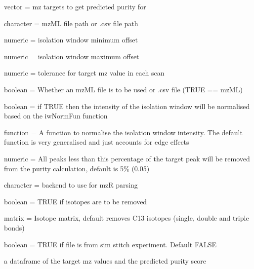 \documentclass[letterpaper]{book}
\begin{document}
\begin{Arguments}
\begin{ldescription}
\item[\code{mztargets}] vector = mz targets to get predicted purity for

\item[\code{filepth}] character = mzML file path or .csv file path

\item[\code{minOffset}] numeric = isolation window minimum offset

\item[\code{maxOffset}] numeric = isolation window maximum offset

\item[\code{ppm}] numeric = tolerance for target mz value in each scan

\item[\code{mzML}] boolean = Whether an mzML file is to be used or .csv file (TRUE == mzML)

\item[\code{iwNorm}] boolean = if TRUE then the intensity of the isolation window will be normalised based on the iwNormFun function

\item[\code{iwNormFun}] function = A function to normalise the isolation window intensity. The default function is very generalised and just accounts for edge effects

\item[\code{ilim}] numeric = All peaks less than this percentage of the target peak will be removed from the purity calculation, default is 5\% (0.05)

\item[\code{mzRback}] character = backend to use for mzR parsing

\item[\code{isotopes}] boolean = TRUE if isotopes are to be removed

\item[\code{im}] matrix = Isotope matrix, default removes C13 isotopes (single, double and triple bonds)

\item[\code{sim}] boolean = TRUE if file is from sim stitch experiment. Default FALSE
\end{ldescription}
\end{Arguments}
%
\begin{Value}
a dataframe of the target mz values and the predicted purity score
\end{Value}
\end{document}
